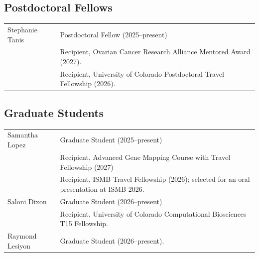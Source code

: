 
\subsection*{Postdoctoral Fellows}

\begin{tabularx}{\textwidth}{@{}p{3.6cm}X@{}}

Stephanie Tanis &
Postdoctoral Fellow (2025--present)\\
& Recipient, Ovarian Cancer Research Alliance Mentored Award (2027).\\
& Recipient, University of Colorado Postdoctoral Travel Fellowship (2026).\\

\end{tabularx}

\vspace{0.8em}

\subsection*{Graduate Students}

\begin{tabularx}{\textwidth}{@{}p{3.6cm}X@{}}

Samantha Lopez &
Graduate Student (2025--present)\\
& Recipient, Advanced Gene Mapping Course with Travel Fellowship  (2027)\\[0.8em]
& Recipient, ISMB Travel Fellowship (2026); selected for an oral presentation at ISMB 2026.\\[0.8em]

Saloni Dixon &
Graduate Student (2026--present)\\
& Recipient, University of Colorado Computational Biosciences T15 Fellowship.\\[0.8em]

Raymond Lesiyon &
Graduate Student (2026--present).\\

\end{tabularx}